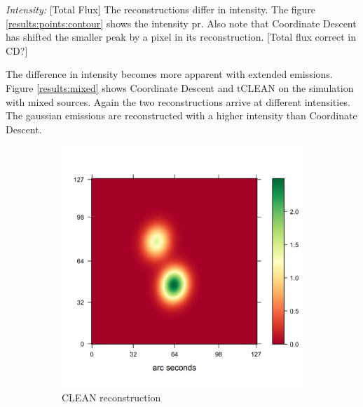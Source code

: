 \textit{Intensity:} [Total Flux] The reconstructions differ in intensity. The figure \ref{results:points:contour} shows the intensity pr. Also note that Coordinate Descent has shifted the smaller peak by a pixel in its reconstruction. [Total flux correct in CD?]



The difference in intensity becomes more apparent with extended emissions. Figure \ref{results:mixed} shows Coordinate Descent and tCLEAN on the simulation with mixed sources. Again the two reconstructions arrive at different intensities. The gaussian emissions are reconstructed with a higher intensity than Coordinate Descent.

\begin{figure}[h]
	\centering
	\begin{subfigure}[b]{0.4\linewidth}
		\includegraphics[width=\linewidth]{./chapters/20.results/points/tclean_points.png}
		\caption{CLEAN reconstruction}
		\label{results:mixed:tclean}
	\end{subfigure}
	\begin{subfigure}[b]{0.4\linewidth}

\end{subfigure}
\end{figure}

